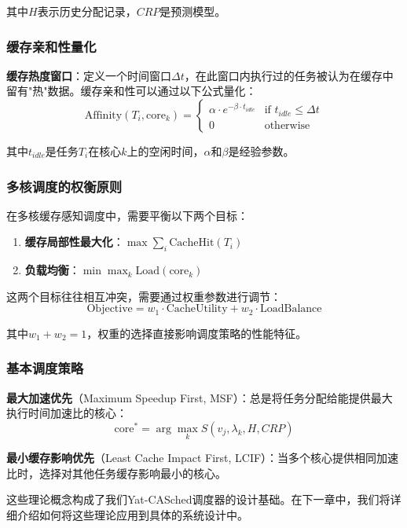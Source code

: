其中$H$表示历史分配记录，$CRP$是预测模型。

\subsubsection{缓存亲和性量化}

\textbf{缓存热度窗口}：定义一个时间窗口$\Delta t$，在此窗口内执行过的任务被认为在缓存中留有"热"数据。缓存亲和性可以通过以下公式量化：
$$\text{Affinity}(T_i, \text{core}_k) = \begin{cases}
\alpha \cdot e^{-\beta \cdot t_{idle}} & \text{if } t_{idle} \leq \Delta t \\
0 & \text{otherwise}
\end{cases}$$

其中$t_{idle}$是任务$T_i$在核心$k$上的空闲时间，$\alpha$和$\beta$是经验参数。

\subsubsection{多核调度的权衡原则}

在多核缓存感知调度中，需要平衡以下两个目标：

\begin{enumerate}
    \item \textbf{缓存局部性最大化}：$\max \sum_{i} \text{CacheHit}(T_i)$
    \item \textbf{负载均衡}：$\min \max_k \text{Load}(\text{core}_k)$
\end{enumerate}

这两个目标往往相互冲突，需要通过权重参数进行调节：
$$\text{Objective} = w_1 \cdot \text{CacheUtility} + w_2 \cdot \text{LoadBalance}$$

其中$w_1 + w_2 = 1$，权重的选择直接影响调度策略的性能特征。

\subsubsection{基本调度策略}

\textbf{最大加速优先}（Maximum Speedup First, MSF）：总是将任务分配给能提供最大执行时间加速比的核心：
$$\text{core}^* = \arg\max_k S(v_j, \lambda_k, H, CRP)$$

\textbf{最小缓存影响优先}（Least Cache Impact First, LCIF）：当多个核心提供相同加速比时，选择对其他任务缓存影响最小的核心。

这些理论概念构成了我们Yat-CASched调度器的设计基础。在下一章中，我们将详细介绍如何将这些理论应用到具体的系统设计中。

